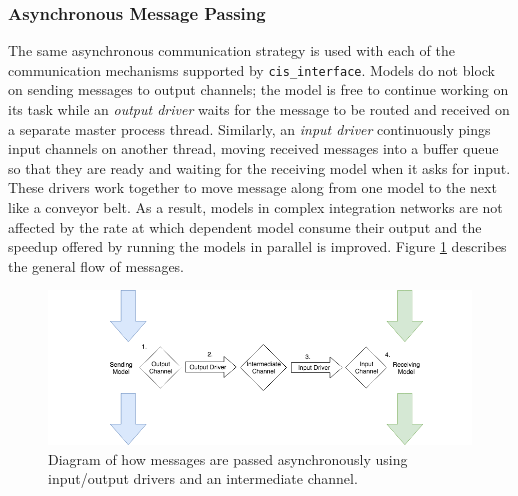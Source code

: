 \documentclass[journal]{IEEEtran}
\newcommand{\cis}{{\tt cis\_interface}{}}
\begin{document}
\subsubsection{Asynchronous Message Passing}\label{SSS:async}
%
The same asynchronous communication strategy is used with each of the communication mechanisms supported by {\cis}. 
Models do not block on sending messages to 
output channels; the model is free to continue working on its task while 
an \emph{output driver} waits for the message to be routed and received on a separate master process thread. Similarly, 
an \emph{input driver} continuously pings input channels on another thread, moving received messages into a 
buffer queue so that they are ready and waiting for the receiving model 
when it asks for input. These drivers work together to move message along from one model to the next like a conveyor belt. 
As a result, models in complex integration networks are not affected by the rate at which dependent model consume their output and the speedup offered by running the models in parallel is improved. Figure \ref{fig:async} describes the general flow of messages.
%
\ifinclfig
 	\begin{figure}[htbp]
	\begin{center}
	\includegraphics[width=\columnwidth,keepaspectratio]{./images/io_drivers.png}
	\caption{Diagram of how messages are passed asynchronously using input/output drivers and an intermediate channel.}
	\label{fig:async}
	\end{center}
	\end{figure}
\fi
%
\end{document}
